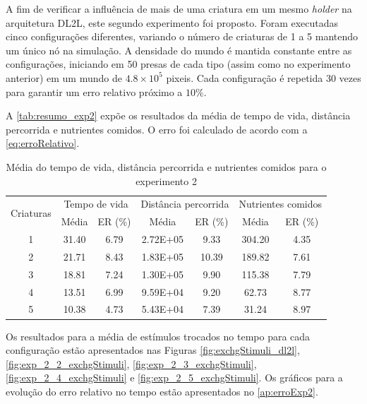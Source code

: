 A fim de verificar a influência de mais de uma criatura em um mesmo \textit{holder} na arquitetura DL2L, este segundo experimento foi proposto.  Foram executadas cinco configurações diferentes, variando o número de criaturas de 1 a 5 mantendo um único nó na simulação. A densidade do mundo é mantida constante entre as configurações, iniciando em 50 presas de cada tipo (assim como no experimento anterior) em um mundo de $4.8 \times 10^{5}$ pixeis. Cada configuração é repetida 30 vezes para garantir um erro relativo próximo a $10\%$. 

A \autoref{tab:resumo_exp2} expõe os resultados da média de tempo de vida, distância percorrida e nutrientes comidos. O erro foi calculado de acordo com a \autoref{eq:erroRelativo}.

\begin{table}[H]
\centering
\caption{Média do tempo de vida, distância percorrida e nutrientes comidos para o experimento 2}
\begin{tabular}{ccccccc}
\hline
\multirow{2}{*}{Criaturas} & \multicolumn{2}{c}{ Tempo de vida } & \multicolumn{2}{c}{ Distância percorrida } & \multicolumn{2}{c}{ Nutrientes comidos } \\
& Média & ER (\%) & Média & ER (\%) & Média & ER (\%) \\
\hline
1 & 31.40 & 6.79 & 2.72E+05 & 9.33 & 304.20 & 4.35 \\
2 & 21.71 & 8.43 & 1.83E+05 & 10.39 & 189.82 & 7.61 \\
3 & 18.81 & 7.24 & 1.30E+05 & 9.90 & 115.38 & 7.79 \\
4 & 13.51 & 6.99 & 9.59E+04 & 9.20 & 62.73 & 8.77 \\
5 & 10.38 & 4.73 & 5.43E+04 & 7.39 & 31.24 & 8.97 \\
\hline
\end{tabular}
\label{tab:resumo_exp2}
\end{table}

Os resultados para a média de estímulos trocados no tempo para cada configuração estão apresentados nas Figuras \ref{fig:exchgStimuli_dl2l}, \ref{fig:exp_2_2_exchgStimuli}, \ref{fig:exp_2_3_exchgStimuli}, \ref{fig:exp_2_4_exchgStimuli} e \ref{fig:exp_2_5_exchgStimuli}. Os gráficos para a evolução do erro relativo no tempo estão apresentados no \autoref{ap:erroExp2}.

